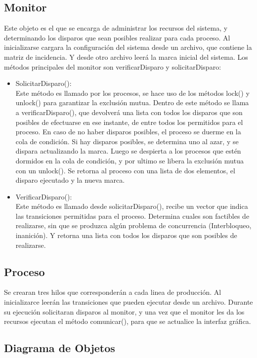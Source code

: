 \documentclass[10pt]{article} %
\begin{document}
\subsection{Monitor}
Este objeto es el que se encarga de administrar los recursos del sistema, y determinando los disparos que sean posibles realizar para cada proceso. 
Al inicializarse cargara la configuración del sistema desde un archivo, que contiene la matriz de incidencia. Y desde otro archivo leerá la marca inicial del sistema.
Los métodos principales del monitor son verificarDisparo y solicitarDisparo:
\begin{itemize}
\item SolicitarDisparo():\\Este método es llamado por los procesos, se hace uso de los métodos lock() y unlock() para garantizar la exclusión mutua.
Dentro de este método se llama a verificarDisparo(), que devolverá una lista con todos los disparos que son posibles de efectuarse en ese instante, de entre todos  los permitidos para el proceso.
En caso de no haber disparos posibles, el proceso se duerme en la cola de condición. Si hay disparos posibles, se determina uno al azar, y se dispara actualizando la marca. Luego se despierta a los procesos que estén dormidos en la cola de condición, y por ultimo se libera la exclusión mutua con un unlock().
Se retorna al proceso con una lista de dos elementos, el disparo ejecutado y la nueva marca.
\item VerificarDisparo():\\Este método es llamado desde solicitarDisparo(), recibe un vector que indica las transiciones permitidas para el proceso. Determina cuales son factibles de realizarse, sin que se produzca algún problema de concurrencia (Interbloqueo, inanición). Y retorna una lista con todos los disparos que son posibles de realizarse.
\end{itemize}
\subsection{Proceso}
Se crearan tres hilos que corresponderán a cada linea de producción. Al inicializarce leerán las transiciones que pueden ejecutar desde un archivo. Durante su ejecución solicitaran disparos al monitor, y una vez que el monitor les da los recursos ejecutan el método comunicar(), para que se actualice la interfaz gráfica.

\subsection{Diagrama de Objetos}
\end{document}
